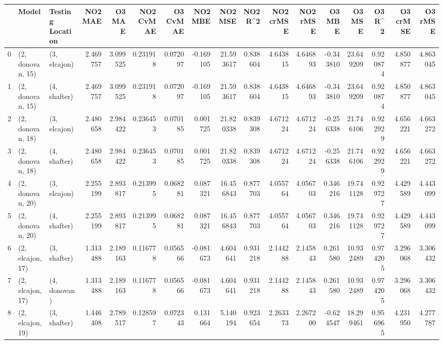 \begin{tabular}{lllrrrrrrrrrrrrrr}
\toprule
{} &             Model & Testing Location &   NO2 MAE &    O3 MAE &  NO2 CvMAE &  O3 CvMAE &   NO2 MBE &    NO2 MSE &   NO2 R\textasciicircum2 &  NO2 crMSE &  NO2 rMSE &    O3 MBE &     O3 MSE &    O3 R\textasciicircum2 &  O3 crMSE &   O3 rMSE \\
\midrule
0  &  (2, donovan, 15) &     (3, elcajon) &  2.469757 &  3.099525 &   0.231918 &  0.072097 & -0.169105 &  21.593617 &  0.838604 &   4.643815 &  4.646893 & -0.343810 &  23.649209 &  0.920874 &  4.850877 &  4.863045 \\
1  &  (2, donovan, 15) &     (4, shafter) &  2.469757 &  3.099525 &   0.231918 &  0.072097 & -0.169105 &  21.593617 &  0.838604 &   4.643815 &  4.646893 & -0.343810 &  23.649209 &  0.920874 &  4.850877 &  4.863045 \\
2  &  (2, donovan, 18) &     (3, elcajon) &  2.480658 &  2.984422 &   0.236453 &  0.070185 &  0.001725 &  21.820338 &  0.839308 &   4.671224 &  4.671224 & -0.256338 &  21.746106 &  0.922929 &  4.656221 &  4.663272 \\
3  &  (2, donovan, 18) &     (4, shafter) &  2.480658 &  2.984422 &   0.236453 &  0.070185 &  0.001725 &  21.820338 &  0.839308 &   4.671224 &  4.671224 & -0.256338 &  21.746106 &  0.922929 &  4.656221 &  4.663272 \\
4  &  (2, donovan, 20) &     (3, elcajon) &  2.255199 &  2.893817 &   0.213995 &  0.068281 &  0.087321 &  16.456843 &  0.877703 &   4.055764 &  4.056703 &  0.346216 &  19.741128 &  0.929727 &  4.429589 &  4.443099 \\
5  &  (2, donovan, 20) &     (4, shafter) &  2.255199 &  2.893817 &   0.213995 &  0.068281 &  0.087321 &  16.456843 &  0.877703 &   4.055764 &  4.056703 &  0.346216 &  19.741128 &  0.929727 &  4.429589 &  4.443099 \\
6  &  (2, elcajon, 17) &     (3, shafter) &  1.313488 &  2.189163 &   0.116778 &  0.056566 & -0.081673 &   4.604641 &  0.931218 &   2.144288 &  2.145843 &  0.261580 &  10.932489 &  0.974205 &  3.296068 &  3.306432 \\
7  &  (2, elcajon, 17) &     (4, donovan) &  1.313488 &  2.189163 &   0.116778 &  0.056566 & -0.081673 &   4.604641 &  0.931218 &   2.144288 &  2.145843 &  0.261580 &  10.932489 &  0.974205 &  3.296068 &  3.306432 \\
8  &  (2, elcajon, 19) &     (3, shafter) &  1.446408 &  2.789517 &   0.128597 &  0.072343 &  0.131664 &   5.140194 &  0.923654 &   2.263373 &  2.267200 & -0.624547 &  18.299461 &  0.956965 &  4.231950 &  4.277787 \\

\end{tabular}

